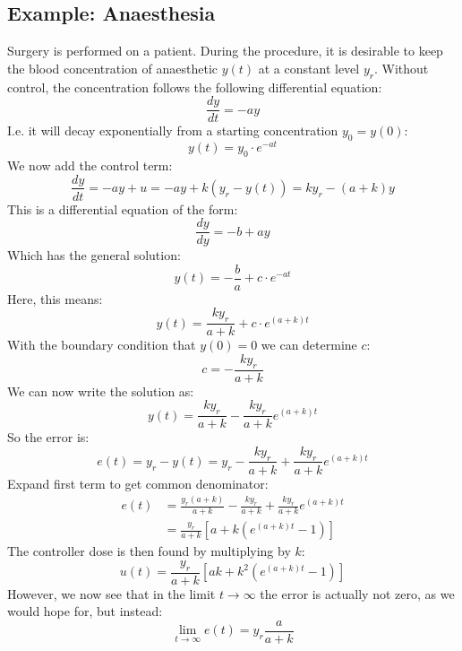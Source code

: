 \documentclass[12pt, a4paper]{article}
\numberwithin{equation}{section}
\begin{document}
\subsection{Example: Anaesthesia}
Surgery is performed on a patient. During the procedure, it is desirable to keep the blood concentration of anaesthetic $y(t)$ at a constant level $y_r$. Without control, the concentration follows the following differential equation:
\begin{equation}
\frac{dy}{dt}=-ay
\end{equation}
I.e. it will decay exponentially from a starting concentration $y_0=y(0)$:
\begin{equation}
y(t)=y_0\cdot e^{-at}
\end{equation}
We now add the control term:
\begin{equation}
\frac{dy}{dt}=-ay+u=-ay+k(y_r-y(t))=ky_r-(a+k)y
\end{equation}
This is a differential equation of the form:
\begin{equation}
\frac{dy}{dy}=-b+ay
\end{equation}
Which has the general solution:
\begin{equation}
y(t)=-\frac{b}{a}+c\cdot e^{-at}
\end{equation}
Here, this means:
\begin{equation}
y(t)=\frac{ky_r}{a+k}+c\cdot e^{(a+k)t}
\end{equation}
With the boundary condition that $y(0)=0$ we can determine $c$:
\begin{equation}
c=-\frac{ky_r}{a+k}
\end{equation}
We can now write the solution as:
\begin{equation}
y(t)=\frac{ky_r}{a+k}-\frac{ky_r}{a+k}e^{(a+k)t}
\end{equation}
So the error is:
\begin{equation}
e(t)=y_r-y(t)=y_r-\frac{ky_r}{a+k}+\frac{ky_r}{a+k}e^{(a+k)t}
\end{equation}
Expand first term to get common denominator:
\begin{align}
e(t)&=\frac{y_r(a+k)}{a+k}-\frac{ky_r}{a+k}+\frac{ky_r}{a+k}e^{(a+k)t}\\
&=\frac{y_r}{a+k}\left[a+k(e^{(a+k)t}-1)\right]
\end{align}
The controller dose is then found by multiplying by $k$:
\begin{equation}
u(t)=\frac{y_r}{a+k}\left[ak+k^2(e^{(a+k)t}-1)\right]
\end{equation}
However, we now see that in the limit $t\rightarrow\infty$ the error is actually not zero, as we would hope for, but instead:
\begin{equation}
\lim_{t\rightarrow\infty}e(t)=y_r\frac{a}{a+k}
\end{equation}
\end{document}

